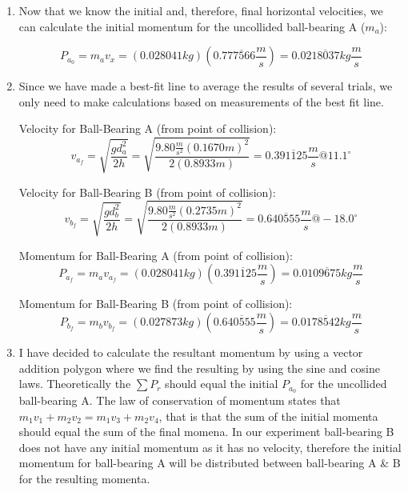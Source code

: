 \documentclass[12pt]{article}
\begin{document}
\begin{enumerate}
\item{
Now that we know the initial and, therefore, final horizontal velocities, we can calculate the initial momentum for the uncollided ball-bearing A ($m_{a}$):

\begin{equation}
P_{a_{0}}=m_{a}v_{x}=(0.028041kg)(0.777\overline{5}66\frac{m}{s})=0.0218\overline{0}37kg\frac{m}{s}
\end{equation}}
\pagebreak
\space
\newline

\item{
Since we have made a best-fit line to average the results of several trials, we only need to make calculations based on measurements of the best fit line.

Velocity for Ball-Bearing A (from point of collision):
\begin{equation}
v_{a_{f}}=\sqrt{\frac{gd_{a}^2}{2h}}=\sqrt{\frac{9.80\frac{m}{s^2}(0.1670 m)^2}{2(0.8933 m)}}=0.391\overline{1}25\frac{m}{s}@ 11.1^{\circ}
\end{equation}

Velocity for Ball-Bearing B (from point of collision):
\begin{equation}
v_{b_{f}}=\sqrt{\frac{gd_{b}^2}{2h}}=\sqrt{\frac{9.80\frac{m}{s^2}(0.2735 m)^2}{2(0.8933 m)}}=0.640\overline{5}55\frac{m}{s}@ -18.0^{\circ}
\end{equation}

Momentum for Ball-Bearing A (from point of collision):
\begin{equation}
P_{a_{f}}=m_{a}v_{a_{f}}=(0.028041kg)(0.391\overline{1}25\frac{m}{s})=0.0109\overline{6}75kg\frac{m}{s}
\end{equation}

Momentum for Ball-Bearing B (from point of collision):
\begin{equation}
P_{b_{f}}=m_{b}v_{b_{f}}=(0.027873kg)(0.640\overline{5}55\frac{m}{s})=0.0178\overline{5}42kg\frac{m}{s}
\end{equation}}
\pagebreak
\space
\newline

\item{
I have decided to calculate the resultant momentum by using a vector addition polygon where we find the resulting by using the sine and cosine laws. Theoretically the $\sum{P_{r}}$ should equal the initial $P_{a_{0}}$ for the uncollided ball-bearing A. The law of conservation of momentum states that $m_{1}v_{1}+m_{2}v_{2}=m_{1}v_{3}+m_{2}v_{4}$, that is that the sum of the initial momenta should equal the sum of the final momena. In our experiment ball-bearing B does not have any initial momentum as it has no velocity, therefore the initial momentum for ball-bearing A will be distributed between ball-bearing A \& B for the resulting momenta.

}
\end{enumerate}
\end{document}
